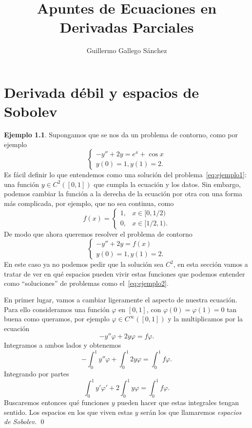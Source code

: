 \documentclass[12pt,a4paper]{book}
\title{Apuntes de Ecuaciones en Derivadas Parciales}
\author{Guillermo Gallego Sánchez}
\date{}
\theoremstyle{definition} \newtheorem{defn}[thm]{Definición}
\theoremstyle{definition} \newtheorem{ejemplo}[thm]{Ejemplo}
\theoremstyle{definition} \newtheorem{ejercicio}[thm]{Ejercicio}
\theoremstyle{remark} \newtheorem*{obs}{Observación}
\begin{document}
\maketitle
\tableofcontents
\chapter{Derivada débil y espacios de Sobolev}
\begin{ejemplo}
  Supongamos que se nos da un problema de contorno, como por ejemplo
  \begin{equation}
    \begin{cases}
      -y''+2y=e^x+\cos x \\
      y(0)=1, y(1)=2.
    \end{cases}
    \label{eq:ejemplo1}
  \end{equation}
  Es fácil definir lo que entendemos como una solución del problema~\eqref{eq:ejemplo1}: una función $y\in C^2([0,1])$ que cumpla la ecuación y los datos. Sin embargo, podemos cambiar la función a la derecha de la ecuación por otra con una forma más complicada, por ejemplo, que no sea continua, como
  \begin{equation*}
    f(x)=
    \begin{cases}
      1, & x \in [0,1/2) \\
      0, & x \in [1/2,1).
    \end{cases}
  \end{equation*}
  De modo que ahora queremos resolver el problema de contorno
  \begin{equation}
    \begin{cases}
      -y''+2y=f(x) \\
      y(0)=1, y(1)=2.
    \end{cases}
    \label{eq:ejemplo2}
  \end{equation}
  En este caso ya no podemos pedir que la solución sea $C^2$, en esta sección vamos a tratar de ver en qué espacios pueden vivir estas funciones que podemos entender como ``soluciones'' de problemas como el~\eqref{eq:ejemplo2}. 

  En primer lugar, vamos a cambiar ligeramente el aspecto de nuestra ecuación. Para ello consideramos una función $\varphi$ en $[0,1]$, con $\varphi(0)=\varphi(1)=0$ tan buena como queramos, por ejemplo $\varphi\in C^{\infty}([0,1])$ y la multiplicamos por la ecuación
  \begin{equation*}
    -y''\varphi + 2y \varphi = f \varphi.
  \end{equation*}
  Integramos a ambos lados y obtenemos
  \begin{equation*}
    -\int_0^1 y'' \varphi + \int_0^1 2y \varphi = \int_0^1 f \varphi.
  \end{equation*}
  Integrando por partes
  \begin{equation*}
    \int_0^1 y' \varphi' + 2 \int_0^1 y \varphi = \int_0^1 f \varphi.
  \end{equation*}
  Buscaremos entonces qué funciones $y$ pueden hacer que estas integrales tengan sentido. Los espacios en los que viven estas $y$ serán los que llamaremos \emph{espacios de Sobolev}. \qed
\end{ejemplo}
\end{document}
